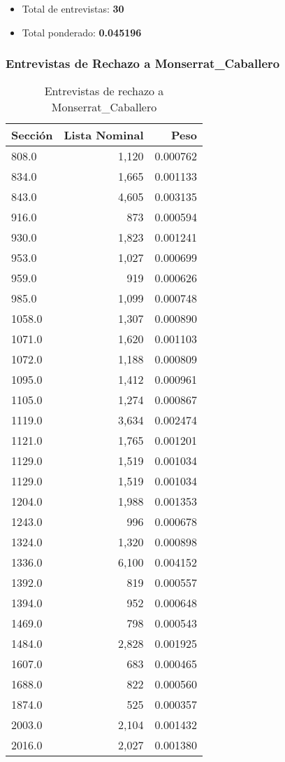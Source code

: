 \documentclass[a4paper,12pt]{article}
\begin{document}
\begin{itemize}
\item Total de entrevistas: \textbf{30}
\item Total ponderado: \textbf{0.045196}
\end{itemize}

\subsubsection*{Entrevistas de Rechazo a Monserrat_Caballero}
\begin{table}[h]
\centering
\begin{tabular}{lrr}
\toprule
Sección & Lista Nominal & Peso \\ \midrule
808.0 & 1,120 & 0.000762 \\ 
834.0 & 1,665 & 0.001133 \\ 
843.0 & 4,605 & 0.003135 \\ 
916.0 & 873 & 0.000594 \\ 
930.0 & 1,823 & 0.001241 \\ 
953.0 & 1,027 & 0.000699 \\ 
959.0 & 919 & 0.000626 \\ 
985.0 & 1,099 & 0.000748 \\ 
1058.0 & 1,307 & 0.000890 \\ 
1071.0 & 1,620 & 0.001103 \\ 
1072.0 & 1,188 & 0.000809 \\ 
1095.0 & 1,412 & 0.000961 \\ 
1105.0 & 1,274 & 0.000867 \\ 
1119.0 & 3,634 & 0.002474 \\ 
1121.0 & 1,765 & 0.001201 \\ 
1129.0 & 1,519 & 0.001034 \\ 
1129.0 & 1,519 & 0.001034 \\ 
1204.0 & 1,988 & 0.001353 \\ 
1243.0 & 996 & 0.000678 \\ 
1324.0 & 1,320 & 0.000898 \\ 
1336.0 & 6,100 & 0.004152 \\ 
1392.0 & 819 & 0.000557 \\ 
1394.0 & 952 & 0.000648 \\ 
1469.0 & 798 & 0.000543 \\ 
1484.0 & 2,828 & 0.001925 \\ 
1607.0 & 683 & 0.000465 \\ 
1688.0 & 822 & 0.000560 \\ 
1874.0 & 525 & 0.000357 \\ 
2003.0 & 2,104 & 0.001432 \\ 
2016.0 & 2,027 & 0.001380 \\ 
\bottomrule
\end{tabular}
\caption{Entrevistas de rechazo a Monserrat_Caballero}
\end{table}
\end{document}
